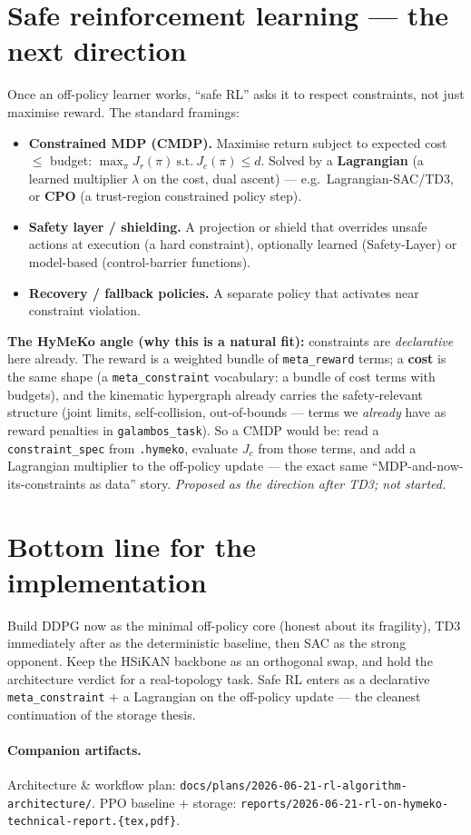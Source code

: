 \documentclass[11pt]{article}
\newcommand{\code}[1]{\texttt{\small #1}}
\begin{document}
\section{Safe reinforcement learning --- the next direction}
Once an off-policy learner works, ``safe RL'' asks it to respect constraints, not just maximise reward.
The standard framings:
\begin{itemize}[nosep]
  \item \textbf{Constrained MDP (CMDP).} Maximise return subject to expected cost $\le$ budget:
        $\max_\pi J_r(\pi)\ \text{s.t.}\ J_c(\pi)\le d$. Solved by a \textbf{Lagrangian} (a learned multiplier
        $\lambda$ on the cost, dual ascent) --- e.g.\ Lagrangian-SAC/TD3, or \textbf{CPO} (a trust-region
        constrained policy step).
  \item \textbf{Safety layer / shielding.} A projection or shield that overrides unsafe actions at execution
        (a hard constraint), optionally learned (Safety-Layer) or model-based (control-barrier functions).
  \item \textbf{Recovery / fallback policies.} A separate policy that activates near constraint violation.
\end{itemize}
\textbf{The HyMeKo angle (why this is a natural fit):} constraints are \emph{declarative} here already. The
reward is a weighted bundle of \code{meta\_reward} terms; a \textbf{cost} is the same shape (a
\code{meta\_constraint} vocabulary: a bundle of cost terms with budgets), and the kinematic hypergraph already
carries the safety-relevant structure (joint limits, self-collision, out-of-bounds --- terms we \emph{already}
have as reward penalties in \code{galambos\_task}). So a CMDP would be: read a \code{constraint\_spec} from
\code{.hymeko}, evaluate $J_c$ from those terms, and add a Lagrangian multiplier to the off-policy update ---
the exact same ``MDP-and-now-its-constraints as data'' story. \emph{Proposed as the direction after TD3; not
started.}

\section{Bottom line for the implementation}
Build DDPG now as the minimal off-policy core (honest about its fragility), TD3 immediately after as the
deterministic baseline, then SAC as the strong opponent. Keep the HSiKAN backbone as an orthogonal swap, and
hold the architecture verdict for a real-topology task. Safe RL enters as a declarative \code{meta\_constraint}
$+$ a Lagrangian on the off-policy update --- the cleanest continuation of the storage thesis.

\paragraph{Companion artifacts.} Architecture \& workflow plan:
\code{docs/plans/2026-06-21-rl-algorithm-architecture/}. PPO baseline + storage:
\code{reports/2026-06-21-rl-on-hymeko-technical-report.\{tex,pdf\}}.
\end{document}
